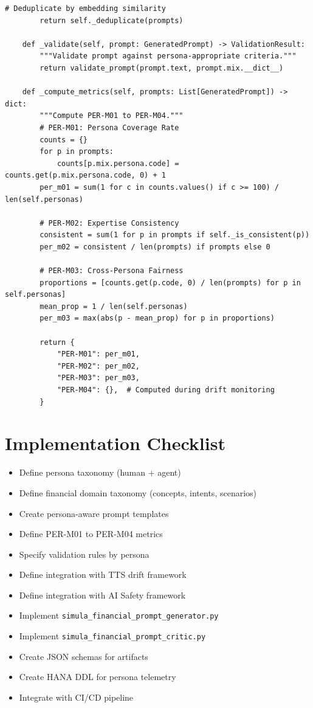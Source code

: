 \begin{lstlisting}[language=jsonx,caption={simula\_financial\_prompt\_generator.py}]
        # Deduplicate by embedding similarity
        return self._deduplicate(prompts)
    
    def _validate(self, prompt: GeneratedPrompt) -> ValidationResult:
        """Validate prompt against persona-appropriate criteria."""
        return validate_prompt(prompt.text, prompt.mix.__dict__)
    
    def _compute_metrics(self, prompts: List[GeneratedPrompt]) -> dict:
        """Compute PER-M01 to PER-M04."""
        # PER-M01: Persona Coverage Rate
        counts = {}
        for p in prompts:
            counts[p.mix.persona.code] = counts.get(p.mix.persona.code, 0) + 1
        per_m01 = sum(1 for c in counts.values() if c >= 100) / len(self.personas)
        
        # PER-M02: Expertise Consistency
        consistent = sum(1 for p in prompts if self._is_consistent(p))
        per_m02 = consistent / len(prompts) if prompts else 0
        
        # PER-M03: Cross-Persona Fairness
        proportions = [counts.get(p.code, 0) / len(prompts) for p in self.personas]
        mean_prop = 1 / len(self.personas)
        per_m03 = max(abs(p - mean_prop) for p in proportions)
        
        return {
            "PER-M01": per_m01,
            "PER-M02": per_m02,
            "PER-M03": per_m03,
            "PER-M04": {},  # Computed during drift monitoring
        }
\end{lstlisting}

\section{Implementation Checklist}

\begin{itemize}
  \item[\texttt{[x]}] Define persona taxonomy (human + agent)
  \item[\texttt{[x]}] Define financial domain taxonomy (concepts, intents, scenarios)
  \item[\texttt{[x]}] Create persona-aware prompt templates
  \item[\texttt{[x]}] Define PER-M01 to PER-M04 metrics
  \item[\texttt{[x]}] Specify validation rules by persona
  \item[\texttt{[x]}] Define integration with TTS drift framework
  \item[\texttt{[x]}] Define integration with AI Safety framework
  \item[\texttt{[ ]}] Implement \texttt{simula\_financial\_prompt\_generator.py}
  \item[\texttt{[ ]}] Implement \texttt{simula\_financial\_prompt\_critic.py}
  \item[\texttt{[ ]}] Create JSON schemas for artifacts
  \item[\texttt{[ ]}] Create HANA DDL for persona telemetry
  \item[\texttt{[ ]}] Integrate with CI/CD pipeline
\end{itemize}

